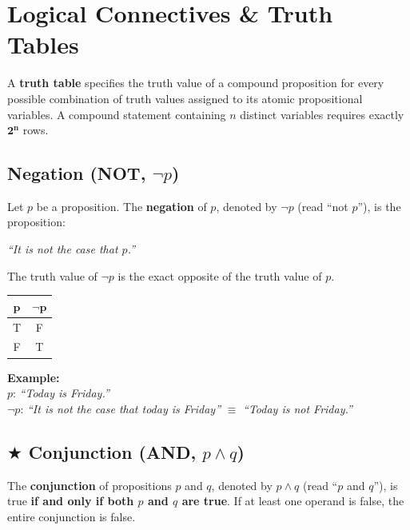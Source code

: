\documentclass[11pt,a4paper]{article}
\begin{document}
\newpage

\section{Logical Connectives \& Truth Tables}

A \textbf{truth table} specifies the truth value of a compound proposition for every possible combination of truth values assigned to its atomic propositional variables. A compound statement containing $n$ distinct variables requires exactly $\mathbf{2^n}$ rows.

\subsection{Negation (NOT, \texorpdfstring{$\neg p$}{neg p})}
\begin{defbox}[Negation]
Let $p$ be a proposition. The \textbf{negation} of $p$, denoted by $\neg p$ (read ``not $p$''), is the proposition:
\begin{center}
\textit{``It is not the case that $p$.''}
\end{center}
The truth value of $\neg p$ is the exact opposite of the truth value of $p$.
\end{defbox}

\begin{center}
\renewcommand{\arraystretch}{1.2}
\begin{tabular}{|c|c|}
\hline
\rowcolor{navy!15} $\mathbf{p}$ & $\mathbf{\neg p}$ \\
\hline
T & F \\
F & T \\
\hline
\end{tabular}
\quad
\begin{minipage}{0.65\textwidth}
\small
\textbf{Example:}\\
$p$: \textit{``Today is Friday.''} \\
$\neg p$: \textit{``It is not the case that today is Friday''} $\equiv$ \textit{``Today is not Friday.''}
\end{minipage}
\end{center}

\subsection{\texorpdfstring{$\bigstar$ }{*}Conjunction (AND, \texorpdfstring{$p \wedge q$}{p and q})}
\begin{defbox}[Conjunction]
The \textbf{conjunction} of propositions $p$ and $q$, denoted by $p \wedge q$ (read ``$p$ and $q$''), is true \textbf{if and only if both $p$ and $q$ are true}. If at least one operand is false, the entire conjunction is false.
\end{defbox}
\end{document}
